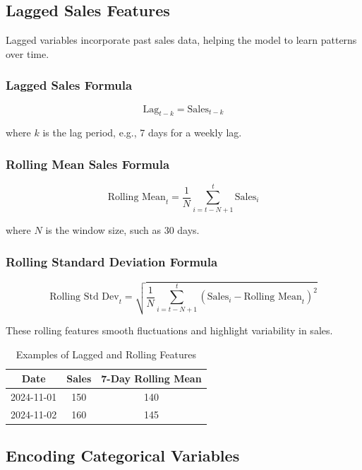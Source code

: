 \subsection*{Lagged Sales Features}

Lagged variables incorporate past sales data, helping the model to learn patterns over time.

\subsubsection*{Lagged Sales Formula}
\begin{equation}
    \text{Lag}_{t-k} = \text{Sales}_{t-k}
\end{equation}

where \( k \) is the lag period, e.g., 7 days for a weekly lag.

\subsubsection*{Rolling Mean Sales Formula}
\begin{equation}
    \text{Rolling Mean}_t = \frac{1}{N} \sum_{i=t-N+1}^{t} \text{Sales}_i
\end{equation}

where \( N \) is the window size, such as 30 days.

\subsubsection*{Rolling Standard Deviation Formula}
\begin{equation}
    \text{Rolling Std Dev}_t = \sqrt{\frac{1}{N} \sum_{i=t-N+1}^{t} (\text{Sales}_i - \text{Rolling Mean}_t)^2}
\end{equation}

These rolling features smooth fluctuations and highlight variability in sales.

\begin{table}[H]
\centering
\caption{Examples of Lagged and Rolling Features}
\begin{tabular}{|c|c|c|}
\hline
\textbf{Date} & \textbf{Sales} & \textbf{7-Day Rolling Mean} \\ \hline
2024-11-01 & 150 & 140 \\ \hline
2024-11-02 & 160 & 145 \\ \hline
\end{tabular}
\end{table}

\subsection*{Encoding Categorical Variables}

